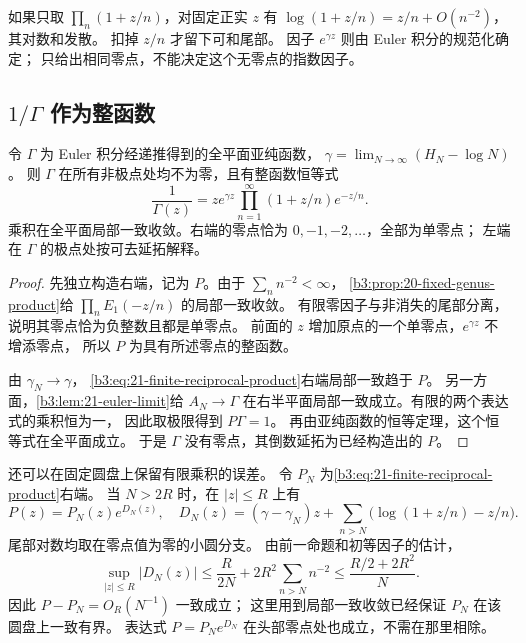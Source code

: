 \ProseParagraphBreak
如果只取 \(\prod_n(1+z/n)\)，对固定正实 \(z\) 有
\(\log(1+z/n)=z/n+O(n^{-2})\)，其对数和发散。
扣掉 \(z/n\) 才留下可和尾部。
因子 \(e^{\gamma z}\) 则由 Euler 积分的规范化确定；
只给出相同零点，不能决定这个无零点的指数因子。

\subsection{\texorpdfstring{\(1/\Gamma\)}{1/\AnalysisPdfGamma} 作为整函数}
\label{b3:subsec:210303}

\begin{theorem}\label{b3:thm:21-product}
令 \(\Gamma\) 为 Euler 积分经递推得到的全平面亚纯函数，
\(\gamma=\lim_{N\to\infty}(H_N-\log N)\)。
则 \(\Gamma\) 在所有非极点处均不为零，且有整函数恒等式
\begin{equation}\label{b3:eq:21-gamma-product}
 \frac1{\Gamma(z)}
 =z e^{\gamma z}\prod_{n=1}^\infty(1+z/n)e^{-z/n}.
\end{equation}
乘积在全平面局部一致收敛。右端的零点恰为
\(0,-1,-2,\ldots\)，全部为单零点；
左端在 \(\Gamma\) 的极点处按可去延拓解释。
\end{theorem}
\begin{proof}
先独立构造右端，记为 \(P\)。由于 \(\sum_n n^{-2}<\infty\)，
\cref{b3:prop:20-fixed-genus-product}给
\(\prod_n E_1(-z/n)\) 的局部一致收敛。
有限零因子与非消失的尾部分离，说明其零点恰为负整数且都是单零点。
前面的 \(z\) 增加原点的一个单零点，\(e^{\gamma z}\) 不增添零点，
所以 \(P\) 为具有所述零点的整函数。

由 \(\gamma_N\to\gamma\)，
\eqref{b3:eq:21-finite-reciprocal-product}右端局部一致趋于 \(P\)。
另一方面，\cref{b3:lem:21-euler-limit}给 \(A_N\to\Gamma\)
在右半平面局部一致成立。有限的两个表达式的乘积恒为一，
因此取极限得到 \(P\Gamma=1\)。
再由亚纯函数的恒等定理，这个恒等式在全平面成立。
于是 \(\Gamma\) 没有零点，其倒数延拓为已经构造出的 \(P\)。
\end{proof}

还可以在固定圆盘上保留有限乘积的误差。
令 \(P_N\) 为\eqref{b3:eq:21-finite-reciprocal-product}右端。
当 \(N>2R\) 时，在 \(|z|\le R\) 上有
\[
 P(z)=P_N(z)e^{D_N(z)},\quad
 D_N(z)=(\gamma-\gamma_N)z+
       \sum_{n>N}\bigl(\log(1+z/n)-z/n\bigr).
\]
尾部对数均取在零点值为零的小圆分支。
由前一命题和初等因子的估计，
\[
 \sup_{|z|\le R}|D_N(z)|
 \le\frac{R}{2N}+2R^2\sum_{n>N}n^{-2}
 \le\frac{R/2+2R^2}{N}.
\]
因此 \(P-P_N=O_R(N^{-1})\) 一致成立；
这里用到局部一致收敛已经保证 \(P_N\) 在该圆盘上一致有界。
表达式 \(P=P_Ne^{D_N}\) 在头部零点处也成立，不需在那里相除。

